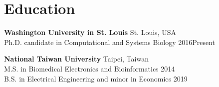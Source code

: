 \section{Education}

\begin{outerlist}

\item \textbf{Washington University in St. Louis} \hfill
	St. Louis, USA \\
	Ph.D. candidate in Computational and Systems Biology \hfill
	2016\textendash Present

\item \textbf{National Taiwan University} \hfill
	Taipei, Taiwan \\
	M.S. in Biomedical Electronics and Bioinformatics \hfill
	2014 \\
	B.S. in Electrical Engineering and minor in Economics \hfill
	2019 \\

\end{outerlist}
